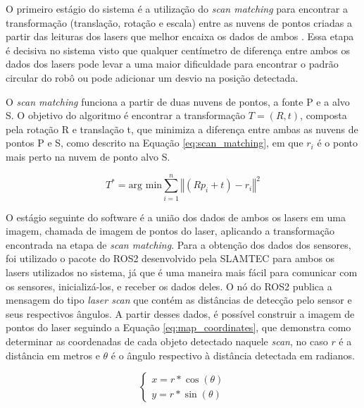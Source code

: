 \documentclass[acronym, symbols, table, deposito]{fei}
\begin{document}
				O primeiro estágio do sistema é a utilização do \textit{scan matching} para encontrar a transformação (translação, rotação e escala) entre as nuvens de pontos criadas a partir das leituras dos lasers que melhor encaixa os dados de ambos \cite{NIETO200739}. Essa etapa é decisiva no sistema visto que qualquer centímetro de diferença entre ambos os dados dos lasers pode levar a uma maior dificuldade para encontrar o padrão circular do robô ou pode adicionar um desvio na posição detectada.
								
				O \textit{scan matching} funciona a partir de duas nuvens de pontos, a fonte P e a alvo S. O objetivo do algoritmo é encontrar a transformação $T = (R, t)$, composta pela rotação R e translação t, que minimiza a diferença entre ambas as nuvens de pontos P e S, como descrito na Equação \eqref{eq:scan_matching}, em que $r_i$ é o ponto mais perto na nuvem de ponto alvo S.
				
				\begin{equation} \label{eq:scan_matching}
					T^* = \text{arg min} \sum_{i=1}^{n}\left\Vert (Rp_i + t) - r_i \right\Vert^2
				\end{equation}
			
				O estágio seguinte do software é a união dos dados de ambos os lasers em uma imagem, chamada de imagem de pontos do laser, aplicando a transformação encontrada na etapa de \textit{scan matching}. Para a obtenção dos dados dos sensores, foi utilizado o pacote do ROS2 desenvolvido pela SLAMTEC para ambos os lasers utilizados no sistema, já que é uma maneira mais fácil para comunicar com os sensores, inicializá-los, e receber os dados deles. O nó do ROS2 publica a mensagem do tipo \textit{laser scan} que contém as distâncias de detecção pelo sensor e seus respectivos ângulos. A partir desses dados, é possível construir a imagem de pontos do laser seguindo a Equação \eqref{eq:map_coordinates}, que demonstra como determinar as coordenadas de cada objeto detectado naquele \textit{scan}, no caso $r$ é a distância em metros e $\theta$ é o ângulo respectivo à distância detectada em radianos.
				
				\begin{equation}\label{eq:map_coordinates}
					\begin{cases}
						x = r * \cos(\theta) \\
						y = r * \sin(\theta)
					\end{cases}
				\end{equation}
			
\end{document}
